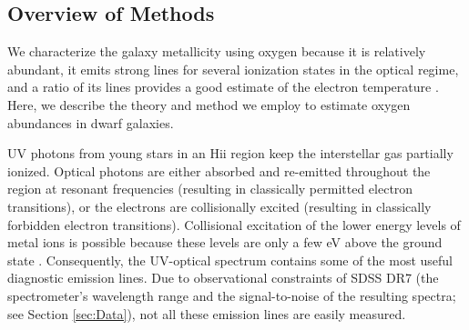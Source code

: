 \subsection{Overview of Methods}

We characterize the galaxy metallicity using oxygen because it is relatively 
abundant, it emits strong lines for several ionization states in the optical 
regime, and a ratio of its lines provides a good estimate of the electron 
temperature \citep{Kewley02}.  Here, we describe the theory and method we employ 
to estimate oxygen abundances in dwarf galaxies.

UV photons from young stars in an H{\sc ii} region keep the interstellar gas 
partially ionized.  Optical photons are either absorbed and re-emitted 
throughout the region at resonant frequencies (resulting in classically 
permitted electron transitions), or the electrons are collisionally excited 
(resulting in classically forbidden electron transitions).  Collisional 
excitation of the lower energy levels of metal ions is possible because these 
levels are only a few eV above the ground state \citep{DeRobertis87}.  
Consequently, the UV-optical spectrum contains some of the most useful 
diagnostic emission lines.  Due to observational constraints of SDSS DR7 (the 
spectrometer's wavelength range and the signal-to-noise of the resulting 
spectra; see Section \ref{sec:Data}), not all these emission lines are easily 
measured.

